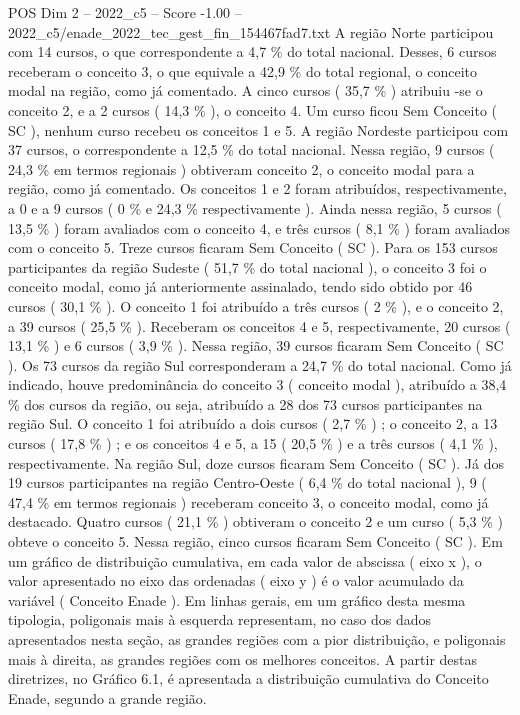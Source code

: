 \begin{textsample}{POS Dim 2 – 2022\_c5 – Score -1.00 – 2022\_c5/enade\_2022\_tec\_gest\_fin\_154467fad7.txt}
A região Norte participou com 14 cursos, o que correspondente a 4,7 \% do total nacional.
Desses, 6 cursos receberam o conceito 3, o que equivale a 42,9 \% do total regional, o conceito modal na região, como já comentado.
A cinco cursos ( 35,7 \% ) atribuiu -se o conceito 2, e a 2 cursos ( 14,3 \% ), o conceito 4.
Um curso ficou Sem Conceito ( SC ), nenhum curso recebeu os conceitos 1 e 5.
A região Nordeste participou com 37 cursos, o correspondente a 12,5 \% do total nacional.
Nessa região, 9 cursos ( 24,3 \% em termos regionais ) obtiveram conceito 2, o conceito modal para a região, como já comentado.
Os conceitos 1 e 2 foram atribuídos, respectivamente, a 0 e a 9 cursos ( 0 \% e 24,3 \% respectivamente ).
Ainda nessa região, 5 cursos ( 13,5 \% ) foram avaliados com o conceito 4, e três cursos ( 8,1 \% ) foram avaliados com o conceito 5.
Treze cursos ficaram Sem Conceito ( SC ).
Para os 153 cursos participantes da região Sudeste ( 51,7 \% do total nacional ), o conceito 3 foi o conceito modal, como já anteriormente assinalado, tendo sido obtido por 46 cursos ( 30,1 \% ).
O conceito 1 foi atribuído a três cursos ( 2 \% ), e o conceito 2, a 39 cursos ( 25,5 \% ).
Receberam os conceitos 4 e 5, respectivamente, 20 cursos ( 13,1 \% ) e 6 cursos ( 3,9 \% ).
Nessa região, 39 cursos ficaram Sem Conceito ( SC ).
Os 73 cursos da região Sul corresponderam a 24,7 \% do total nacional.
Como já indicado, houve predominância do conceito 3 ( conceito modal ), atribuído a 38,4 \% dos cursos da região, ou seja, atribuído a 28 dos 73 cursos participantes na região Sul.
O conceito 1 foi atribuído a dois cursos ( 2,7 \% ) ; o conceito 2, a 13 cursos ( 17,8 \% ) ; e os conceitos 4 e 5, a 15 ( 20,5 \% ) e a três cursos ( 4,1 \% ), respectivamente.
Na região Sul, doze cursos ficaram Sem Conceito ( SC ).
Já dos 19 cursos participantes na região Centro-Oeste ( 6,4 \% do total nacional ), 9 ( 47,4 \% em termos regionais ) receberam conceito 3, o conceito modal, como já destacado.
Quatro cursos ( 21,1 \% ) obtiveram o conceito 2 e um curso ( 5,3 \% ) obteve o conceito 5.
Nessa região, cinco cursos ficaram Sem Conceito ( SC ).
Em um gráfico de distribuição cumulativa, em cada valor de abscissa ( eixo x ), o valor apresentado no eixo das ordenadas ( eixo y ) é o valor acumulado da variável ( Conceito Enade ).
Em linhas gerais, em um gráfico desta mesma tipologia, poligonais mais à esquerda representam, no caso dos dados apresentados nesta seção, as grandes regiões com a pior distribuição, e poligonais mais à direita, as grandes regiões com os melhores conceitos.
A partir destas diretrizes, no Gráfico 6.1, é apresentada a distribuição cumulativa do Conceito Enade, segundo a grande região.

\end{textsample}
